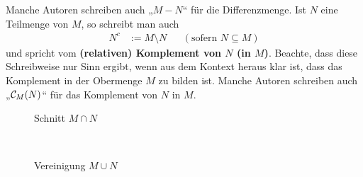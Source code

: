 \begin{defin}
\begin{itemize}
        Manche Autoren schreiben auch „$M-N$“ für die Differenzmenge. Ist $N$ eine Teilmenge von $M$, so schreibt man auch
        \begin{align*}
            N^c & := M\setminus N && (\text{sofern $N\subseteq M$})
        \end{align*}
        und spricht vom \textbf{(relativen) Komplement von $N$ (in $M$)}. Beachte, dass diese Schreibweise nur Sinn ergibt, wenn aus dem Kontext heraus klar ist, dass das Komplement in der Obermenge $M$ zu bilden ist. Manche Autoren schreiben auch „$\mathcal C_M(N)$“ für das Komplement von $N$ in $M$.
	\end{itemize}
    \begin{figure}[ht]
        \begin{minipage}{.48\textwidth}
            \centering
            \caption{Schnitt $M\cap N$}
        \end{minipage}
        \quad
        \begin{minipage}{.48\textwidth}
            \centering
            \caption{Vereinigung $M\cup N$}
        \end{minipage}
        \quad\\[1em]
        \begin{minipage}{.48\textwidth}
            \centering

\end{minipage}
\end{figure}
\end{defin}
